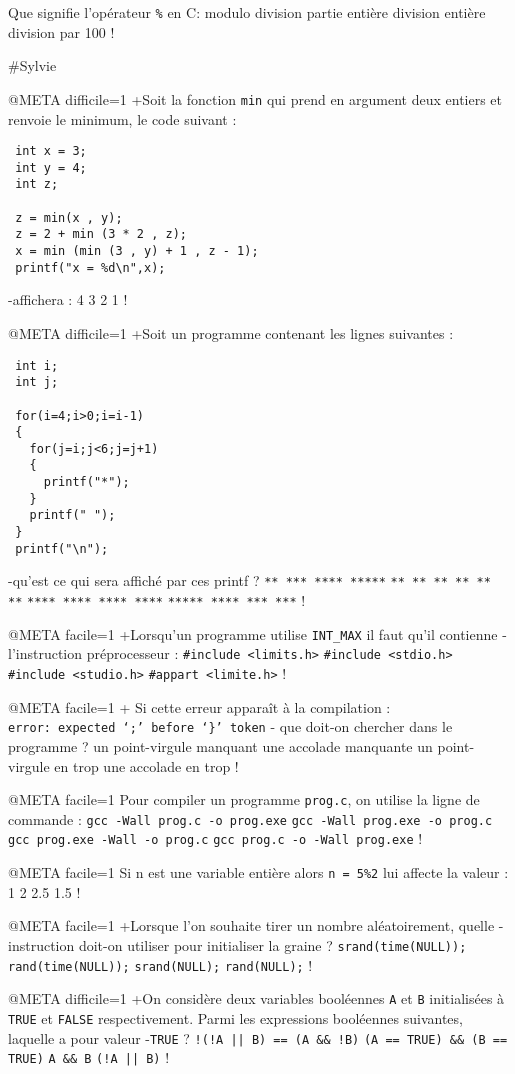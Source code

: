 Que signifie l'opérateur \verb|%| en C:
 modulo
 division
 partie entière
 division entière
 division par 100
!


#Sylvie


@META difficile=1
+Soit la fonction \verb|min| qui prend en argument deux entiers et renvoie le minimum, le code suivant :
 \begin{verbatim}
 int x = 3;
 int y = 4;
 int z;

 z = min(x , y);
 z = 2 + min (3 * 2 , z);
 x = min (min (3 , y) + 1 , z - 1);
 printf("x = %d\n",x);
   \end{verbatim}
-affichera :
 4
 3
 2
 1
!

@META difficile=1
+Soit un programme contenant les lignes suivantes :
 \begin{verbatim}
 int i;
 int j;
  
 for(i=4;i>0;i=i-1)
 {
   for(j=i;j<6;j=j+1)
   {
     printf("*");
   } 
   printf(" ");
 }
 printf("\n");
 \end{verbatim}
-qu'est ce qui sera affiché par ces printf ?
 \verb|** *** **** *****|
 \verb|** ** ** ** ** **|
 \verb|**** **** **** ****|
 \verb|***** **** *** ***|
!

@META facile=1
+Lorsqu'un programme utilise \verb|INT_MAX| il faut qu'il contienne
-l'instruction préprocesseur :
 \verb|#include <limits.h>|
 \verb|#include <stdio.h>|
 \verb|#include <studio.h>|
 \verb|#appart <limite.h>|
!

@META facile=1
+ Si cette erreur apparaît à la compilation : \\
\verb+error: expected ‘;’ before ‘}’ token+ 
- que doit-on chercher dans le programme ?
 un point-virgule manquant
 une accolade manquante
 un point-virgule en trop
 une accolade en trop
!

@META facile=1
Pour compiler un programme \verb|prog.c|, on utilise la ligne de commande : 
 \verb|gcc -Wall prog.c -o prog.exe|
 \verb|gcc -Wall prog.exe -o prog.c|
 \verb|gcc prog.exe -Wall -o prog.c|
 \verb|gcc prog.c -o -Wall prog.exe|
!

@META facile=1
Si n est une variable entière alors \verb|n = 5%2| lui affecte la valeur :
 1
 2
 2.5
 1.5
!

@META facile=1
+Lorsque l'on souhaite tirer un nombre aléatoirement, quelle
-instruction doit-on utiliser pour initialiser la graine ?
 \verb|srand(time(NULL));|
 \verb|rand(time(NULL));|
 \verb|srand(NULL);|
 \verb|rand(NULL);|
!

@META difficile=1
+On considère deux variables bool\'eennes \verb|A| et \verb|B|
initialisées à \verb|TRUE| et \verb|FALSE| respectivement. Parmi
les expressions bool\'eennes suivantes, laquelle a pour valeur
-\verb|TRUE| ?
 \verb+!(!A || B) == (A && !B)+
 \verb|(A == TRUE) && (B == TRUE)|
 \verb|A && B|
 \verb+(!A || B)+
!

